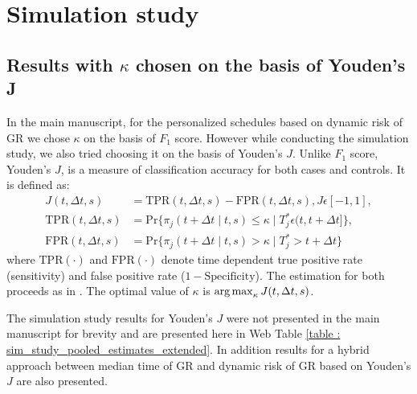 \section{Simulation study}

\subsection{Results with $\kappa$ chosen on the basis of Youden's J}
In the main manuscript, for the personalized schedules based on dynamic risk of GR we chose $\kappa$ on the basis of $F_1$ score. However while conducting the simulation study, we also tried choosing it on the basis of Youden's $J$. Unlike $F_1$ score, Youden's $J$, is a measure of classification accuracy for both cases and controls. It is defined as:
\begin{align*}
J(t, \Delta t, s) &= \text{TPR}(t, \Delta t, s) - \text{FPR}(t, \Delta t, s), J\epsilon [-1,1],\\
\text{TPR}(t, \Delta t, s) &= \mbox{Pr}\big\{\pi_j(t + \Delta t \mid t,s) \leq \kappa \mid T^*_j \epsilon (t, t + \Delta t]\big\},\\
\text{FPR}(t, \Delta t, s) &= \mbox{Pr}\big\{\pi_j(t + \Delta t \mid t,s) > \kappa \mid T^*_j > t + \Delta t \big\}
\end{align*}
where $\mbox{TPR}(\cdot)$ and $\mbox{FPR}(\cdot)$ denote time dependent true positive rate (sensitivity) and false positive rate ($1 - \mbox{Specificity}$). The estimation for both proceeds as in \citep{rizopoulosJMbayes}. The optimal value of $\kappa$ is $\operatorname{arg\,max}_{\kappa} J(t, \Delta t, s)$.

The simulation study results for Youden's $J$ were not presented in the main manuscript for brevity and are presented here in Web Table \ref{table : sim_study_pooled_estimates_extended}. In addition results for a hybrid approach between median time of GR and dynamic risk of GR based on Youden's $J$ are also presented.

